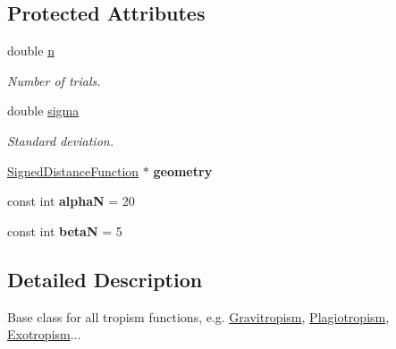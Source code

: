 \subsection*{Protected Attributes}
\begin{DoxyCompactItemize}
\item 
\mbox{\label{classCPlantBox_1_1TropismFunction_a619c74d63319c406730c95679784a04a}} 
double \hyperlink{classCPlantBox_1_1TropismFunction_a619c74d63319c406730c95679784a04a}{n}
\begin{DoxyCompactList}\small\item\em Number of trials. \end{DoxyCompactList}\item 
\mbox{\label{classCPlantBox_1_1TropismFunction_acdc5f9c3beda0a74ddadd591c5d8afaf}} 
double \hyperlink{classCPlantBox_1_1TropismFunction_acdc5f9c3beda0a74ddadd591c5d8afaf}{sigma}
\begin{DoxyCompactList}\small\item\em Standard deviation. \end{DoxyCompactList}\item 
\mbox{\label{classCPlantBox_1_1TropismFunction_a5bdb9779c78cbe4127d3df97391ec08b}} 
\hyperlink{classCPlantBox_1_1SignedDistanceFunction}{Signed\+Distance\+Function} $\ast$ {\bfseries geometry}
\item 
\mbox{\label{classCPlantBox_1_1TropismFunction_a29f210f7bcb5efba734de8d855cccdf4}} 
const int {\bfseries alphaN} = 20
\item 
\mbox{\label{classCPlantBox_1_1TropismFunction_af8e2239a8a87c7b8ac7d01e857d7f9d2}} 
const int {\bfseries betaN} = 5
\end{DoxyCompactItemize}


\subsection{Detailed Description}
Base class for all tropism functions, e.\+g. \hyperlink{classCPlantBox_1_1Gravitropism}{Gravitropism}, \hyperlink{classCPlantBox_1_1Plagiotropism}{Plagiotropism}, \hyperlink{classCPlantBox_1_1Exotropism}{Exotropism}... 

